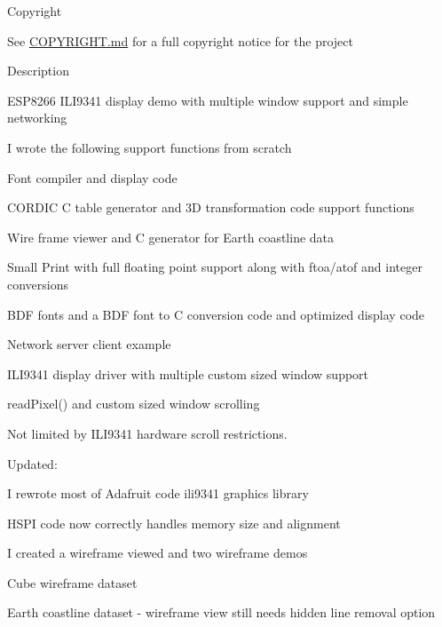 \begin{DoxyParagraph}{Copyright}

\begin{DoxyItemize}
\item See \hyperlink{md_COPYRIGHT}{C\-O\-P\-Y\-R\-I\-G\-H\-T.md} for a full copyright notice for the project
\end{DoxyItemize}
\end{DoxyParagraph}
\begin{DoxyParagraph}{Description}

\begin{DoxyItemize}
\item E\-S\-P8266 I\-L\-I9341 display demo with multiple window support and simple networking
\item I wrote the following support functions from scratch
\item Font compiler and display code
\begin{DoxyItemize}
\item C\-O\-R\-D\-I\-C C table generator and 3\-D transformation code support functions
\item Wire frame viewer and C generator for Earth coastline data
\item Small Print with full floating point support along with ftoa/atof and integer conversions
\item B\-D\-F fonts and a B\-D\-F font to C conversion code and optimized display code
\item Network server client example
\item I\-L\-I9341 display driver with multiple custom sized window support
\item read\-Pixel() and custom sized window scrolling
\begin{DoxyItemize}
\item Not limited by I\-L\-I9341 hardware scroll restrictions.
\end{DoxyItemize}
\end{DoxyItemize}
\item Updated\-:
\begin{DoxyItemize}
\item I rewrote most of Adafruit code ili9341 graphics library
\item H\-S\-P\-I code now correctly handles memory size and alignment
\end{DoxyItemize}
\item I created a wireframe viewed and two wireframe demos
\begin{DoxyItemize}
\item Cube wireframe dataset
\item Earth coastline dataset -\/ wireframe view still needs hidden line removal option
\end{DoxyItemize}
\end{DoxyItemize}
\end{DoxyParagraph}




